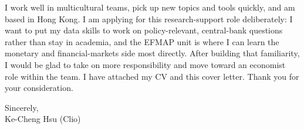 \documentclass[11pt,letterpaper]{article}
\begin{document}
I work well in multicultural teams, pick up new topics and tools quickly, and am based in Hong Kong. I am applying for this research-support role deliberately: I want to put my data skills to work on policy-relevant, central-bank questions rather than stay in academia, and the EFMAP unit is where I can learn the monetary and financial-markets side most directly. After building that familiarity, I would be glad to take on more responsibility and move toward an economist role within the team. I have attached my CV and this cover letter. Thank you for your consideration.

\vspace{0.7em}
Sincerely,\\[1.0em]
Ke-Cheng Hsu (Clio)
\end{document}
